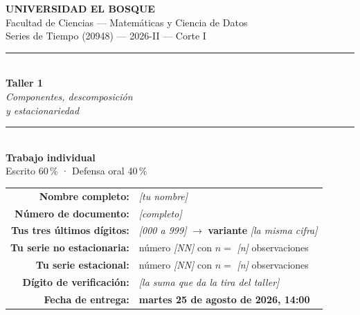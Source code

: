 \documentclass[11pt,a4paper,oneside]{article}
\newcommand{\marcador}[1]{\textcolor{grismarcador}{\textit{[#1]}}}
\begin{document}
\thispagestyle{empty}
\begin{center}

{\large\textbf{UNIVERSIDAD EL BOSQUE}}\\[0.15cm]
{\normalsize Facultad de Ciencias --- Matemáticas y Ciencia de Datos}\\[0.1cm]
{\normalsize Series de Tiempo (20948) --- 2026-II --- Corte I}\\[0.9cm]

\rule{\textwidth}{1.2pt}\\[0.25cm]
{\LARGE\textbf{Taller 1}}\\[0.15cm]
{\large\textit{Componentes, descomposición\\ y estacionariedad}}\\[0.25cm]
\rule{\textwidth}{1.2pt}\\[0.9cm]

{\large\textbf{Trabajo individual}}\\[0.15cm]
{\normalsize Escrito 60\,\% \quad · \quad Defensa oral 40\,\%}\\[1.0cm]

\end{center}

\begin{tabular}{rl}
\textbf{Nombre completo:}          & \marcador{tu nombre} \\[0.25cm]
\textbf{Número de documento:}      & \marcador{completo} \\[0.25cm]
\textbf{Tus tres últimos dígitos:} & \marcador{000 a 999} \quad $\rightarrow$ \quad
                                     \textbf{variante} \marcador{la misma cifra} \\[0.25cm]
\textbf{Tu serie no estacionaria:} & número \marcador{NN} \quad con $n =$ \marcador{n} observaciones \\[0.25cm]
\textbf{Tu serie estacional:}      & número \marcador{NN} \quad con $n =$ \marcador{n} observaciones \\[0.25cm]
\textbf{Dígito de verificación:}   & \marcador{la suma que da la tira del taller} \\[0.25cm]
\textbf{Fecha de entrega:}         & \textbf{martes 25 de agosto de 2026, 14:00} \\
\end{tabular}

\vspace{0.9cm}
\end{document}
